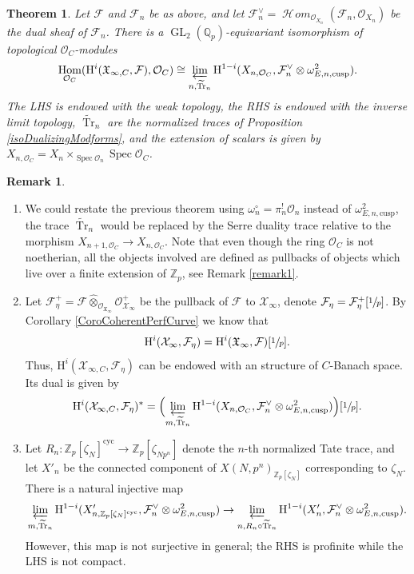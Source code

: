 \documentclass[11pt]{article}
\newcommand{\skpt}{\smallskip}
\newcommand{\cusp}{\mathrm{cusp}}
\newcommand{\cyc}{\mathrm{cyc}}
\newcommand{\wotimes}{\mathbin{\widehat\otimes}}
\numberwithin{equation}{section}
\newtheorem{theo}[prop]{Theorem}
\theoremstyle{definition}
\newtheorem{remark}[prop]{Remark}
\newcommand{\bb}[1]{\mathbb{#1}}
\newcommand{\n}[1]{\mathcal{#1}}
\newcommand{\f}[1]{\mathfrak{#1}}
\newcommand{\s}[1]{\mathscr{#1}}
\DeclareMathOperator{\GL}{GL}
\DeclareMathOperator{\Tr}{Tr}
\DeclareMathOperator{\Hom}{Hom}
\DeclareMathOperator{\Spec}{Spec}
\DeclareMathOperator{\sHom}{\s{H}\!\mathit{om}}
\begin{document}
\begin{theo}
\label{TheoDualityinfinite}
Let $\n{F}$ and $\n{F}_n$ be as above, and let $\n{F}_n^\vee= \sHom_{\s{O}_{X_n}}(\n{F}_n, \s{O}_{X_n})$ be the dual sheaf of $\n{F}_n$. There is a $\GL_2(\bb{Q}_p)$-equivariant isomorphism of topological $\n{O}_C$-modules
\begin{equation}
\label{eqInftyduality}
\Hom_{\n{O}_C}(\mathrm{H}^i (\f{X}_{\infty,C}, \n{F}), \n{O}_C) \cong \varprojlim_{n, \widetilde{\Tr}_n} \mathrm{H}^{1-i}(X_{n,\n{O}_C}, \n{F}_n^{\vee} \otimes \omega^2_{E,n,\cusp}).
\end{equation}
The LHS is endowed with the weak topology, the RHS is endowed with the inverse limit topology, $\widetilde{\Tr}_n$ are the normalized traces of Proposition \ref{isoDualizingModforms}, and the extension of scalars is given by $X_{n,\n{O}_C}=X_{n}\times_{\Spec \n{O}_n} \Spec \n{O}_C$.
\end{theo}

\skpt
\begin{remark}
\label{RemarkDualityinfty}
\begin{enumerate}

\item\label{RemarkDualityinfty1}
We could restate the previous theorem using $\omega^{\circ}_{n}= \pi_n^! \n{O}_n$ instead of $\omega^2_{E,n,\cusp}$, the trace $\widetilde{\Tr}_n$ would be replaced by the Serre duality trace relative to the morphism $X_{n+1, \n{O}_C}\to X_{n,\n{O}_C}$. Note that even though the ring $\n{O}_C$ is not noetherian, all the objects involved are defined as pullbacks of objects which live over a finite extension of $\bb{Z}_p$, see Remark \ref{remark1}.

\item\label{RemarkDualityinfty2}
Let $\n{F}^+_{\eta}= \n{F}\wotimes_{\s{O}_{\f{X}_{\infty}}} \s{O}^+_{\n{X}_{\infty}}$ be the pullback of $\n{F}$ to $\n{X}_{\infty}$, denote $\n{F}_{\eta}= \n{F}^+_{\eta}[\sfrac{1}{p}]$. By Corollary \ref{CoroCoherentPerfCurve} we know that
\[
\mathrm{H}^i(\n{X}_{\infty}, \n{F}_{\eta}) = \mathrm{H}^i(\f{X}_{\infty}, \n{F})[\sfrac{1}{p}].
\]
Thus, $\mathrm{H}^i(\n{X}_{\infty,C}, \n{F}_{\eta}) $ can be endowed with an structure of $C$-Banach space. Its dual is given by
\[
\mathrm{H}^i(\n{X}_{\infty, C}, \n{F}_{\eta})^* = \Bigl(\varprojlim_{m, \widetilde{\Tr}_n} \mathrm{H}^{1-i}(X_{n,\n{O}_C}, \n{F}_n^\vee \otimes \omega^2_{E,n,\cusp})\Bigr)[\sfrac{1}{p}].
\]

\item\label{RemarkDualityinfty3}
Let $R_n: \bb{Z}_p[\zeta_{N}]^{\cyc}\to \bb{Z}_p[\zeta_{Np^n}]$ denote the $n$-th normalized Tate trace, and let $X'_n$ be the connected component of $X(N,p^n)_{\bb{Z}_p[\zeta_{N}]}$ corresponding to $\zeta_N$. There is a natural injective map
\[
\varprojlim_{m , \widetilde{\Tr}_n} \mathrm{H}^{1-i}(X'_{n,\bb{Z}_p[\zeta_N]^{\cyc}}, \n{F}_n^\vee \otimes \omega^2_{E,n,\cusp}) \to \varprojlim_{n, R_n\circ \widetilde{\Tr}_n} \mathrm{H}^{1-i}(X'_{n}, \n{F}_n^\vee \otimes \omega^2_{E,n,\cusp}).
\]
However, this map is not surjective in general; the RHS is profinite while the LHS is not compact.
\end{enumerate}
\end{remark}
\end{document}

